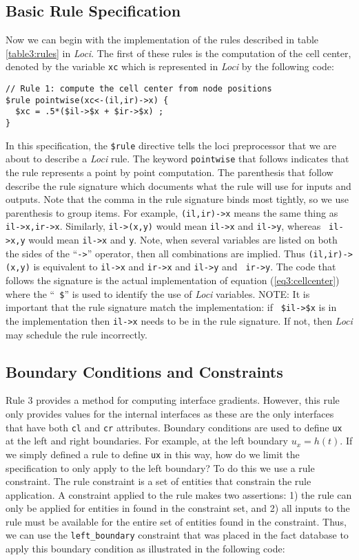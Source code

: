 \documentclass[10pt,epsf,letterpaper,twoside]{book}
\begin{document}
\subsection{Basic Rule Specification}
Now we can begin with the implementation of the rules described in
table \ref{table3:rules} in {\it Loci}.  The first of these rules is the
computation of the cell center, denoted by the variable {\tt xc} which
is represented in {\it Loci} by the following code:
\newpage
\begin{verbatim}
// Rule 1: compute the cell center from node positions
$rule pointwise(xc<-(il,ir)->x) {
  $xc = .5*($il->$x + $ir->$x) ;
}
\end{verbatim}
In this specification, the {\tt \$rule} directive tells the loci
preprocessor that we are about to describe a {\it Loci} rule.  The
keyword {\tt pointwise} that follows indicates that the rule
represents a point by point computation.  The parenthesis that follow
describe the rule signature which documents what the rule will use for
inputs and outputs.  Note that the comma in the rule signature binds
most tightly, so we use parenthesis to group items.  For example,
{\tt(il,ir)->x} means the same thing as {\tt il->x,ir->x}.  Similarly,
{\tt il->(x,y)} would mean {\tt il->x} and {\tt il->y}, whereas {\tt
  il->x,y} would mean {\tt il->x} and {\tt y}.  Note, when several
variables are listed on both the sides of the ``{\tt ->}'' operator,
then all combinations are implied.  Thus {\tt (il,ir)->(x,y)} is
equivalent to {\tt il->x} and {\tt ir->x} and {\tt il->y} and {\tt
  ir->y}.  The code that follows the signature is the actual
implementation of equation (\ref{eq3:cellcenter}) where the ``{\tt
  \$}'' is used to identify the use of {\it Loci} variables.  NOTE: It
is important that the rule signature match the implementation: if {\tt
  \$il->\$x} is in the implementation then {\tt il->x} needs to be in
the rule signature.  If not, then {\it Loci} may schedule the rule
incorrectly.

\subsection{Boundary Conditions and Constraints}

Rule 3 provides a method for computing interface gradients.  However,
this rule only provides values for the internal interfaces as these
are the only interfaces that have both {\tt cl} and {\tt cr}
attributes.  Boundary conditions are used to define {\tt ux} at the
left and right boundaries. For example, at the left boundary $u_x =
h(t)$.   If we simply defined a rule to define {\tt ux} in this way,
how do we limit the specification to only apply to the left boundary?
To do this we use a rule constraint.  The rule constraint is a set of
entities that constrain the rule application.  A constraint applied to
the rule makes two assertions: 1) the rule can only be applied for
entities in found in the constraint set, and 2) all inputs to the rule
must be available for the entire set of entities found in the
constraint. Thus, we can use the {\tt left\_boundary} constraint that
was placed in the fact database to apply this boundary condition as
illustrated in the following code:
\end{document}
